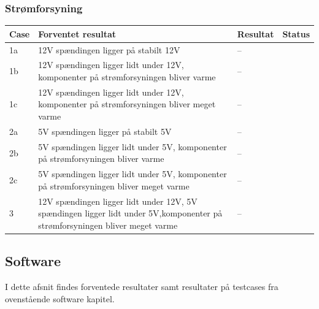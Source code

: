 \subsubsection{Strømforsyning}
\begin{table}[H]
\centering
\begin{tabular}{| p{1cm}  | p{4cm} | p{6cm} | p{1cm} |}
\hline
Case &Forventet resultat &Resultat &Status\\\hline
1a &12V spændingen ligger på stabilt 12V &-- & \\\hline %
1b &12V spændingen ligger lidt under 12V, komponenter på strømforsyningen bliver varme &-- & \\\hline %
1c &12V spændingen ligger lidt under 12V, komponenter på strømforsyningen bliver meget varme &-- & \\\hline %
2a &5V spændingen ligger på stabilt 5V &-- & \\\hline %
2b &5V spændingen ligger lidt under 5V, komponenter på strømforsyningen bliver varme &-- &  \\\hline %
2c &5V spændingen ligger lidt under 5V, komponenter på strømforsyningen bliver meget varme &-- &  \\\hline %
3 &12V spændingen ligger lidt under 12V, 5V spændingen ligger lidt under 5V,komponenter på strømforsyningen bliver meget varme &-- & \\\hline 
\end{tabular}
\end{table}
\newpage
\subsection{Software}
I dette afsnit findes forventede resultater samt resultater på testcases fra ovenstående software kapitel.\\
